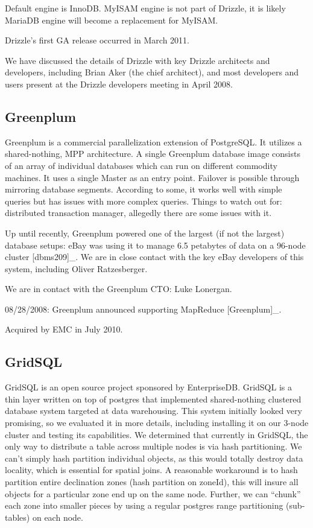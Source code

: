\documentclass[DM,lsstdraft,toc]{lsstdoc}
\begin{document}
Default engine is InnoDB. MyISAM engine is not part of
Drizzle, it is likely MariaDB engine will
become a replacement for MyISAM.

Drizzle's first GA release occurred in March
2011.

We have discussed the details of Drizzle
with key Drizzle architects and developers,
including Brian Aker (the chief architect), and most developers and
users present at the Drizzle developers
meeting in April 2008.

\subsection{Greenplum}\label{greenplum}

Greenplum is a commercial parallelization extension of PostgreSQL. It
utilizes a shared-nothing, MPP architecture. A single Greenplum database
image consists of an array of individual databases which can run on
different commodity machines. It uses a single Master as an entry point.
Failover is possible through mirroring database segments. According to
some, it works well with simple queries but has issues with more complex
queries. Things to watch out for: distributed transaction manager,
allegedly there are some issues with it.

Up until recently, Greenplum powered one of the largest (if not the
largest) database setups: eBay was using it to manage 6.5 petabytes of
data on a 96-node cluster {[}dbms209{]}\_. We are in close contact with
the key eBay developers of this system, including Oliver Ratzesberger.

We are in contact with the Greenplum CTO: Luke Lonergan.

08/28/2008: Greenplum announced supporting MapReduce {[}Greenplum{]}\_.

Acquired by EMC in July 2010.

\subsection{GridSQL}\label{gridsql}

GridSQL is an open source project sponsored by EnterpriseDB. GridSQL is
a thin layer written on top of postgres that implemented shared-nothing
clustered database system targeted at data warehousing. This system
initially looked very promising, so we evaluated it in more details,
including installing it on our 3-node cluster and testing its
capabilities. We determined that currently in GridSQL, the only way to
distribute a table across multiple nodes is via hash partitioning. We
can't simply hash partition individual objects, as this would totally
destroy data locality, which is essential for spatial joins. A
reasonable workaround is to hash partition entire declination zones
(hash partition on zoneId), this will insure all objects for a
particular zone end up on the same node. Further, we can ``chunk'' each
zone into smaller pieces by using a regular postgres range partitioning
(sub-tables) on each node.
\end{document}
